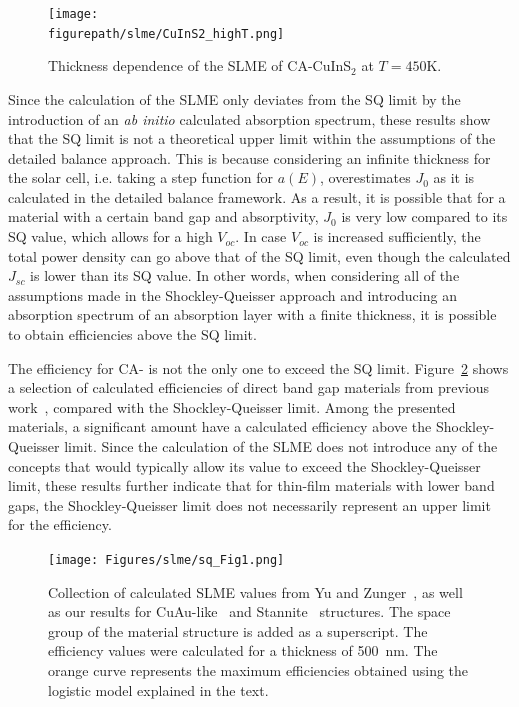 \begin{refsection}
\begin{figure}[ht] 
\centering 
\texttt{[image: \\figurepath/slme/CuInS2\_highT.png]} 
\caption{Thickness dependence of the SLME of CA-CuInS$_2$ at $T = 
450$\si{\kelvin}.} 
\label{slme:fig-SLME_highT} 
\end{figure} 
 
Since the calculation of the SLME only deviates from the SQ limit by the 
introduction of an \textit{ab initio} calculated absorption spectrum, these 
results show that the SQ limit is not a theoretical upper limit within the 
assumptions of the detailed balance approach. This is because considering an 
infinite thickness for the solar cell, i.e. taking a step function for $a(E)$, 
overestimates $J_0$ as it is calculated in the detailed balance framework. As 
a result, it is possible that for a material with a certain band gap and 
absorptivity, $J_0$ is very low compared to its SQ value, which allows for a 
high $V_{oc}$. In case $V_{oc}$ is increased sufficiently, the total power 
density can go above that of the SQ limit, even though the calculated $J_{sc}$ 
is lower than its SQ value. In other words, when considering all of the 
assumptions made in the Shockley-Queisser approach and introducing an absorption 
spectrum of an absorption layer with a finite thickness, it is possible to 
obtain efficiencies above the SQ limit. 
 
 
The efficiency for CA- is not the only one to exceed the SQ limit. 
Figure~\ref{slme:fig-logistic} shows a selection of calculated efficiencies of 
direct band gap materials from previous work~\cite{Yu2012, Bercx2016, 
Sarmadian2016}, compared with the Shockley-Queisser limit. Among the presented 
materials, a significant amount have a calculated efficiency 
above the Shockley-Queisser limit. Since the calculation of the SLME does not 
introduce any of the concepts that would typically allow its value to exceed 
the Shockley-Queisser limit, these results further indicate that for thin-film 
materials with lower band gaps, the Shockley-Queisser limit does not 
necessarily represent an upper limit for the efficiency. 
 
\begin{figure}[ht] 
\centering 
\captionsetup{width=0.9\textwidth}
\texttt{[image: Figures/slme/sq\_Fig1.png]} 
\caption{Collection of calculated SLME values from Yu and 
Zunger~\cite{Yu2012}, as well as our results for CuAu-like~\cite{Bercx2016} 
and Stannite~\cite{Sarmadian2016} structures. The space group of 
the material structure is added as a superscript. The efficiency values were calculated 
for a thickness of 500~\si{\nano\meter}. The orange curve represents the 
maximum efficiencies obtained using the logistic model explained in the text.} 
\label{slme:fig-logistic} 
\end{figure} 
 

\end{refsection}

